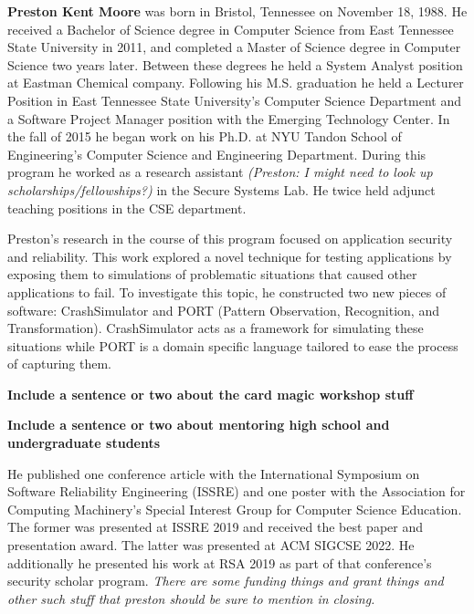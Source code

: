 

\textbf{Preston Kent Moore} was born in Bristol, Tennessee on November 18, 1988.  He received a Bachelor of Science degree in Computer Science from East Tennessee State University in 2011, and completed a Master of Science degree in Computer Science two years later. Between these degrees he held a System Analyst position at Eastman Chemical company. Following his M.S. graduation he held a Lecturer Position in East Tennessee State University's Computer Science Department and a Software Project Manager position with the Emerging Technology Center.
In the fall of 2015 he began work on his Ph.D. at NYU Tandon School of Engineering's Computer Science and Engineering Department.  During this program he worked as a research assistant \textit{(Preston: I might need to look up scholarships/fellowships?)} in the Secure Systems Lab.  He twice held adjunct teaching positions in the CSE department.

Preston's research in the course of this program focused on application security and reliability.
This work explored a novel technique for testing applications by exposing them to simulations of problematic situations that caused other applications to fail.
To investigate this topic, he constructed two new pieces of software: CrashSimulator and PORT (Pattern Observation, Recognition, and Transformation).  CrashSimulator acts as a framework for simulating these situations while PORT is a domain specific language tailored to ease the process of capturing them.

\textbf{Include a sentence or two about the card magic workshop stuff}

\textbf{Include a sentence or two about mentoring high school and undergraduate students}

He published one conference article with the International Symposium on Software Reliability Engineering (ISSRE) and one poster with the Association for Computing Machinery's Special Interest Group for Computer Science Education.  The former was presented at ISSRE 2019 and received the best paper and presentation award.  The latter was presented at ACM SIGCSE 2022.  He additionally he presented his work at RSA 2019 as part of that conference's security scholar program.  \textit{There are some funding things and grant things and other such stuff that preston should be sure to mention in closing.}



